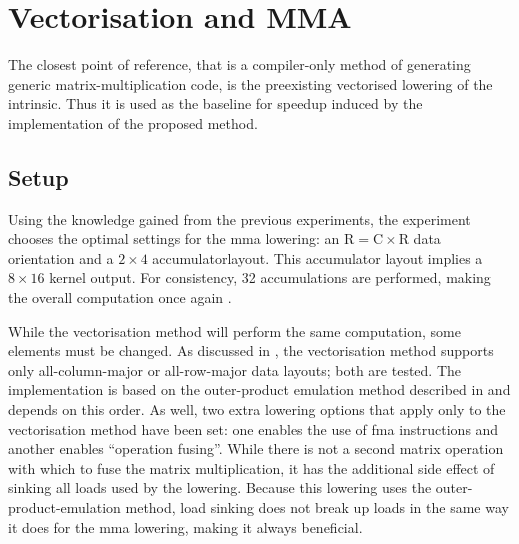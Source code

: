 \documentclass[\main/thesis.tex]{subfiles}
\begin{document}
\section{Vectorisation and MMA}
The closest point of reference, that is a compiler-only method of generating generic matrix-multiplication code, is the preexisting vectorised lowering of the  intrinsic.
Thus it is used as the baseline for speedup induced by the implementation of the proposed method.

\subsection{Setup}
Using the knowledge gained from the previous experiments, the experiment chooses the optimal settings for the \gls{mma} lowering: an $\textrm{R} = \textrm{C} \times \textrm{R}$ data orientation and a $2 \times 4$ accumulator\footnotemark layout.
This accumulator layout implies a $8 \times 16$ kernel output.
For consistency, 32 accumulations are performed, making the overall computation once again .

While the vectorisation method will perform the same computation, some elements must be changed.
As discussed in , the vectorisation method supports only all-column-major or all-row-major data layouts; both are tested.
The implementation is based on the outer-product emulation method described in  and depends on this order.
As well, two extra \gls{lowering} options that apply only to the vectorisation method have been set: one enables the use of \gls{fma} instructions and another enables ``operation fusing''.
While there is not a second matrix operation with which to fuse the matrix multiplication, it has the additional side effect of sinking all loads used by the \gls{lowering}.
Because this \gls{lowering} uses the outer-product-emulation method, load sinking does not break up loads in the same way it does for the \gls{mma} \gls{lowering}, making it always beneficial.
\end{document}
